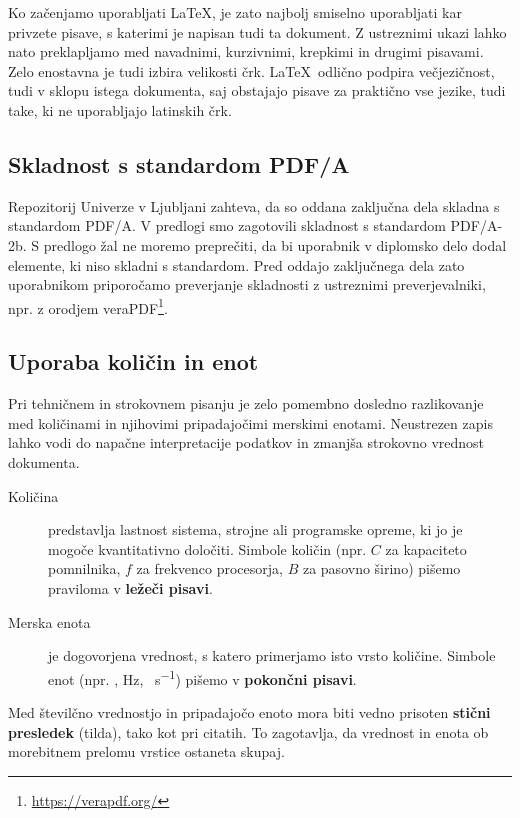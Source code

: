 \documentclass[9pt]{style/friteza}
\begin{document}
Ko začenjamo uporabljati \LaTeX, je zato najbolj smiselno uporabljati kar privzete pisave, s katerimi je napisan tudi ta dokument.
Z ustreznimi ukazi  lahko nato preklapljamo med navadnimi, kurzivnimi, krepkimi in drugimi pisavami.
Zelo enostavna je tudi izbira velikosti črk.
\LaTeX\  odlično podpira večjezičnost, tudi v sklopu istega dokumenta, saj obstajajo pisave za praktično vse jezike, tudi take, ki ne uporabljajo latinskih črk.

\subsection{Skladnost s standardom PDF/A}

Repozitorij Univerze v Ljubljani zahteva, da so oddana zaključna dela skladna s standardom PDF/A. V predlogi smo zagotovili skladnost s standardom PDF/A-2b. S predlogo žal ne moremo preprečiti, da bi uporabnik v diplomsko delo dodal elemente, ki niso skladni s standardom. Pred oddajo zaključnega dela zato uporabnikom priporočamo preverjanje skladnosti z ustreznimi preverjevalniki, npr. z orodjem veraPDF\footnote{\url{https://verapdf.org/}}.

\subsection{Uporaba količin in enot}

Pri tehničnem in strokovnem pisanju je zelo pomembno dosledno razlikovanje med količinami in njihovimi pripadajočimi merskimi enotami. Neustrezen zapis lahko vodi do napačne interpretacije podatkov in zmanjša strokovno vrednost dokumenta.

\begin{description}
    \item[Količina] predstavlja lastnost sistema, strojne ali programske opreme, ki jo je mogoče kvantitativno določiti. Simbole količin (npr. $C$ za kapaciteto pomnilnika, $f$ za frekvenco procesorja, $B$ za pasovno širino) pišemo praviloma v \textbf{ležeči pisavi}.
    \item[Merska enota] je dogovorjena vrednost, s katero primerjamo isto vrsto količine. Simbole enot (npr. \unit{\byte}, \unit{\hertz}, \unit{\bit\per\second}) pišemo v \textbf{pokončni pisavi}.
\end{description}

Med številčno vrednostjo in pripadajočo enoto mora biti vedno prisoten \textbf{stični presledek} (tilda), tako kot pri citatih. To zagotavlja, da vrednost in enota ob morebitnem prelomu vrstice ostaneta skupaj.
\end{document}
